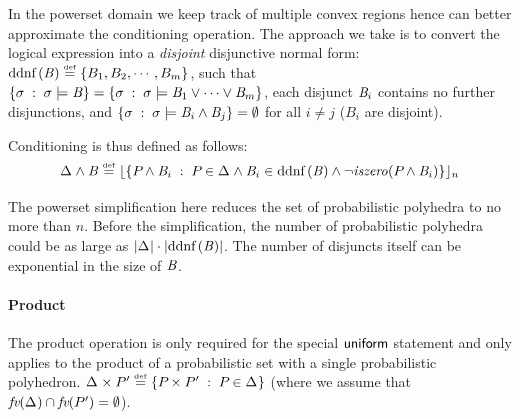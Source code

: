 In the powerset domain we keep track of multiple convex regions hence
can better approximate the conditioning operation. The approach we
take is to convert the logical expression into a \emph{disjoint}
disjunctive normal form: $ \text{ddnf}\left( \mathit{B} \right) \stackrel{\smash{\scriptscriptstyle \mathrm{def}}}= \left\{ B_1, B_2, \cdots,
  B_m \right\} $, such that $ \left\{ \sigma \;:\; \sigma \models \mathit{B} \right\} = \left\{ \sigma
  \;:\; \sigma \models \mathit{B}_1 \vee \cdots \vee \mathit{B}_m \right\} $, each
disjunct $ \mathit{B}_i $ contains no further disjunctions, and $
\left\{ \sigma \;:\; \sigma \models \mathit{B}_i \wedge \mathit{B}_j \right\} = \emptyset
$ for all $ i \neq j $ ($ B_i $ are disjoint).

Conditioning is thus defined as follows:
$$ \Delta_{} \wedge \mathit{B} \stackrel{\smash{\scriptscriptstyle \mathrm{def}}}=
\lfloor \left\{ P_{} \wedge \mathit{B}_i \;:\; P_{} \in \Delta_{} \wedge \mathit{B}_i
  \in \text{ddnf}\left( \mathit{B} \right) \wedge \neg \mathit{iszero}(P_{} \wedge \mathit{B}_i) \right\} \rfloor_{n} $$

The powerset simplification here reduces the set
of probabilistic polyhedra to no more than $ n $. Before the
simplification, the number of probabilistic polyhedra could be as
large as $ \left| \Delta_{} \right| \cdot \left| \text{ddnf}\left( \mathit{B} \right) \right| $. The number of
disjuncts itself can be exponential in the size of $ \mathit{B} $.

\paragraph{Product} The product operation is only required for the
special $ \mathsf{uniform} $ statement and only applies to the product
of a probabilistic set with a single probabilistic polyhedron.
$ \Delta_{} \times P_{}' \stackrel{\smash{\scriptscriptstyle \mathrm{def}}}= \left\{ P_{} \times P_{}' \;:\; P_{} \in \Delta_{} \right\} $
(where we assume that $\textit{fv}(\Delta_{}) \cap \textit{fv}(P_{}') = \emptyset$).





